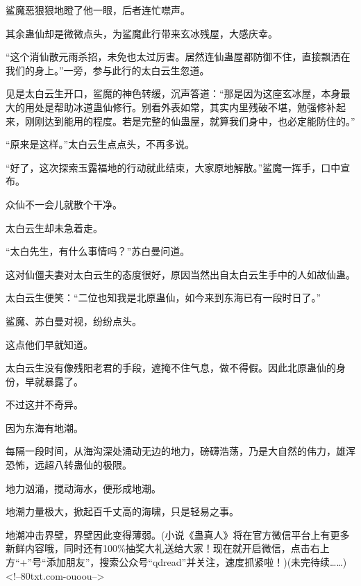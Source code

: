 \begin{this_body}
鲨魔恶狠狠地瞪了他一眼，后者连忙噤声。

其余蛊仙却是微微点头，为鲨魔此行带来玄冰残屋，大感庆幸。

“这个消仙散元雨杀招，未免也太过厉害。居然连仙蛊屋都防御不住，直接飘洒在我们的身上。”一旁，参与此行的太白云生忽道。

见是太白云生开口，鲨魔的神色转缓，沉声答道：“那是因为这座玄冰屋，本身最大的用处是帮助冰道蛊仙修行。别看外表如常，其实内里残破不堪，勉强修补起来，刚刚达到能用的程度。若是完整的仙蛊屋，就算我们身中，也必定能防住的。”

“原来是这样。”太白云生点点头，不再多说。

“好了，这次探索玉露福地的行动就此结束，大家原地解散。”鲨魔一挥手，口中宣布。

众仙不一会儿就散个干净。

太白云生却未急着走。

“太白先生，有什么事情吗？”苏白曼问道。

这对仙僵夫妻对太白云生的态度很好，原因当然出自太白云生手中的人如故仙蛊。

太白云生便笑：“二位也知我是北原蛊仙，如今来到东海已有一段时日了。”

鲨魔、苏白曼对视，纷纷点头。

这点他们早就知道。

太白云生没有像残阳老君的手段，遮掩不住气息，做不得假。因此北原蛊仙的身份，早就暴露了。

不过这并不奇异。

因为东海有地潮。

每隔一段时间，从海沟深处涌动无边的地力，磅礴浩荡，乃是大自然的伟力，雄浑恐怖，远超八转蛊仙的极限。

地力汹涌，搅动海水，便形成地潮。

地潮力量极大，掀起百千丈高的海啸，只是轻易之事。

地潮冲击界壁，界壁因此变得薄弱。(小说《蛊真人》将在官方微信平台上有更多新鲜内容哦，同时还有100\%抽奖大礼送给大家！现在就开启微信，点击右上方“+”号“添加朋友”，搜索公众号“qdread”并关注，速度抓紧啦！)(未完待续……)<!--80txt.com-ouoou-->

\end{this_body}


